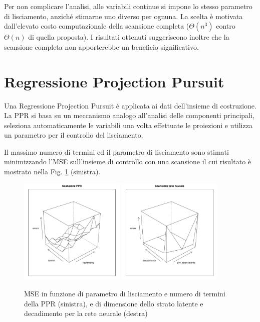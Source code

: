 \documentclass[a4paper, 10pt]{report}
\begin{document}
Per non complicare l'analisi, alle variabili continue si impone lo stesso
parametro di lisciamento, anziché stimarne uno diverso per ognuna. La
scelta è motivata dall'elevato costo computazionale della scansione
completa ($\Theta(n^{3})$ contro $\Theta(n)$ di quella proposta).
I risultati ottenuti suggeriscono inoltre che la scansione completa non
apporterebbe un beneficio significativo.


\section{Regressione Projection Pursuit}
Una Regressione Projection Pursuit è applicata ai dati dell'insieme
di costruzione. La PPR si basa su un meccanismo analogo all'analisi delle
componenti principali, seleziona automaticamente le variabili una
volta effettuate le proiezioni e utilizza un parametro per il controllo
del lisciamento.

Il massimo numero di termini ed il parametro di lisciamento sono stimati
minimizzando l'MSE sull'insieme di controllo con una scansione il cui
risultato è mostrato nella Fig. \ref{fig:PPR-NN} (sinistra).

\begin{figure}
  \includegraphics[width=0.45\textwidth]{../plots/PPR.pdf}
  \includegraphics[width=0.45\textwidth]{../plots/neuralnetwork.pdf}
  \caption{
    MSE in funzione di parametro di lisciamento e numero di termini della PPR (sinistra),
    e di dimensione dello strato latente e decadimento per la rete neurale (destra)
  }
  \label{fig:PPR-NN}
\end{figure}
\end{document}
